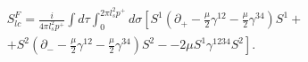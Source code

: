 \begin{equation}
\begin{aligned}
S^F_{lc} = \frac{i}{4 \pi l_s^2 p^+} \int d \tau \int_{0}^{2 \pi l_s^2 p^+} d \sigma
\left[ 
   S^1 \left( \partial_+ - \frac{\mu}{2} \gamma^{12} - \frac{\mu}{2} \gamma^{34} \right) S^1 + 
                                              \right. \\ \left.
   + S^2 \left( \partial_- - \frac{\mu}{2} \gamma^{12} - \frac{\mu}{2} \gamma^{34} \right) S^2 - 
       - 2 \mu  S^1 \gamma^{1234} S^2 
\right].
\end{aligned}
\end{equation}

